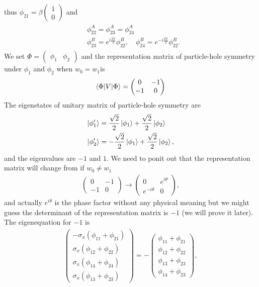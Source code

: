\documentclass[10pt, oneside]{article}
\newcommand{\te}{\theta}
\newcommand{\ph}{\phi}
\newcommand{\p}[1]{\left(#1\right)}
\begin{document}
thus \(\phi_{21} = \beta \begin{pmatrix}
	1 \\ 0	
\end{pmatrix}\)
and
\begin{align}
	\begin{split}
		&\phi_{22}^{A} = \phi_{23}^{A} = \phi_{24}^{A} \\
		&\phi_{23}^{B} = e^{i\frac{2 \pi}{3}} \phi_{22}^{B}, \quad \phi_{24}^{B} = e^{- i\frac{2 \pi}{3}} \phi_{22}^{B}.
	\end{split}
\end{align}
We set \(\Phi = \begin{pmatrix}
	\phi_{1} & \phi_{2}
\end{pmatrix}\) and the representation matrix of particle-hole symmetry under \(\ph_1\) and \(\ph_2\) when \(w_0 = w_1\)is 
\begin{align}
	\braket{\Phi | V | \Phi} = 
	\begin{pmatrix}
		0 & -1 \\ -1 & 0
	\end{pmatrix}
\end{align}
The eigenstates of unitary matrix of particle-hole symmetry are
\begin{align}
	\begin{split}
		\ket{\phi^\prime_{1}} & =   \frac{\sqrt{2}}{2} \ket{\phi_{1}} + \frac{\sqrt{2}}{2} \ket{\phi_{2}} \\
		\ket{\phi^\prime_{2}} & =   - \frac{\sqrt{2}}{2} \ket{\phi_{1}} + \frac{\sqrt{2}}{2} \ket{\phi_{2}},
	\end{split}
\end{align}
and the eigenvalues are \(-1\) and \(1\). We need to ponit out that the representation matrix will change from if \(w_0 \neq w_1\)
\begin{align}
	\begin{pmatrix}
		0 & -1 \\ -1 & 0
	\end{pmatrix} \rightarrow \begin{pmatrix}
		0 & e^{i \te} \\ e^{-i \te} & 0 
	\end{pmatrix},
\end{align}
and actually \(e^{i \te}\) is the phase factor without any physical meaning but we might guess the determinant of the representation matrix is \(-1\) (we will prove it later). The eigenequation for \(-1\) is
\begin{align}
	\begin{pmatrix}
		-\sigma_{x} \p{ \phi_{11} +  \phi_{21}} \\  \sigma_{x} \p{\phi_{12} + \phi_{22}} \\ \sigma_{x} \p{\phi_{14} + \phi_{24}} \\ \sigma_{x} \p{\phi_{13} + \phi_{23}}
	\end{pmatrix} = - \begin{pmatrix}
		\phi_{11} + \phi_{21} \\ \phi_{12} + \phi_{22} \\ \phi_{13} + \phi_{23} \\ \phi_{14} + \phi_{23}
	\end{pmatrix},
\end{align}
\end{document}
